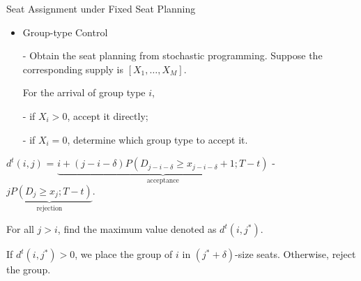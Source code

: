  \begin{frame}{Seat Assignment under Fixed Seat Planning}
    \small
    \begin{itemize}
      \item Group-type Control
      \item[-] Obtain the seat planning from stochastic programming. Suppose the corresponding supply is $[X_1, \ldots, X_M]$.
      
      For the arrival of group type $i$,

      \item[-] if $X_i > 0$, accept it directly;
      \item[-] if $X_i = 0$, determine which group type to accept it.
    \end{itemize}

    $d^{t}(i, j)$ = $\underbrace{i + (j-i-\delta)P(D_{j-i-\delta} \geq x_{j-i-\delta}+1; T-t)}_{\text{acceptance}}$ - $\underbrace{j P(D_{j} \geq x_{j}; T-t)}_{\text{rejection}}.$

    For all $j > i$, find the maximum value denoted as $d^{t}(i, j^{*})$.
    
    If $d^{t}(i, j^{*}) > 0$, we place the group of $i$ in $(j^{*} + \delta)$-size seats. Otherwise, reject the group.

  \end{frame}
  


